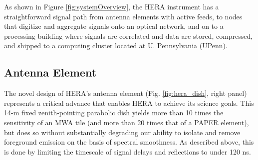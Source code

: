 \documentclass[ars]{copernicus}
\def\nwnh{{\sl NWNH}}
\begin{document}
%
%
%


As shown in Figure \ref{fig:systemOverview}, the HERA instrument has a straightforward signal
path from antenna elements
with active feeds, to nodes that digitize and aggregate signals onto an optical network,
and on to a processing building where signals are correlated and data are stored, compressed,
and shipped to a computing cluster located at U. Pennsylvania (UPenn). 

\subsection{Antenna Element}

The novel design of HERA's antenna element
(Fig. \ref{fig:hera_dish}, right panel) represents a critical advance
that enables HERA to achieve its science goals.  This 14-m
fixed zenith-pointing parabolic dish yields more than 10 times the
sensitivity of an MWA tile (and more than 20 times
that of a PAPER element), but does so without substantially degrading
our ability to isolate and remove foreground emission on the basis of
spectral smoothness.  As described above, this is done by limiting
the timescale of signal delays and reflections to under 120 ns.
\end{document}
